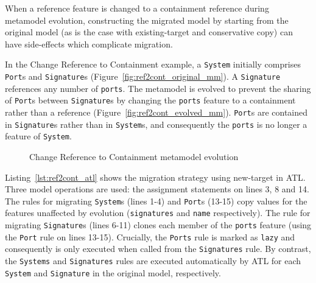 When a reference feature is changed to a containment reference during metamodel evolution, constructing the migrated model by starting from the original model (as is the case with existing-target and conservative copy) can have side-effects which complicate migration.

In the Change Reference to Containment example, a \texttt{System} initially comprises \texttt{Port}s and \texttt{Signature}s (Figure~\ref{fig:ref2cont_original_mm}). A \texttt{Signature} references any number of \texttt{ports}. The metamodel is evolved to prevent the sharing of \texttt{Port}s between \texttt{Signature}s by changing the \texttt{ports} feature to a containment rather than a reference (Figure~\ref{fig:ref2cont_evolved_mm}). \texttt{Port}s are contained in \texttt{Signature}s rather than in \texttt{System}s, and consequently the \texttt{ports} is no longer a feature of \texttt{System}.

\begin{figure}[htbp]
	\centering
	\caption{Change Reference to Containment metamodel evolution}
\label{fig:ref2cont_mms}
\end{figure}

Listing~\ref{lst:ref2cont_atl} shows the migration strategy using new-target in ATL. Three model operations are used: the assignment statements on lines 3, 8 and 14. The rules for migrating \texttt{System}s (lines 1-4) and \texttt{Port}s (13-15) copy values for the features unaffected by evolution (\texttt{signatures} and \texttt{name} respectively). The rule for migrating \texttt{Signature}s (lines 6-11) clones each member of the \texttt{ports} feature (using the \texttt{Port} rule on lines 13-15). Crucially, the \texttt{Ports} rule is marked as \texttt{lazy} and consequently is only executed when called from the \texttt{Signatures} rule. By contrast, the \texttt{Systems} and \texttt{Signatures} rules are executed automatically by ATL for each \texttt{System} and \texttt{Signature} in the original model, respectively. 

